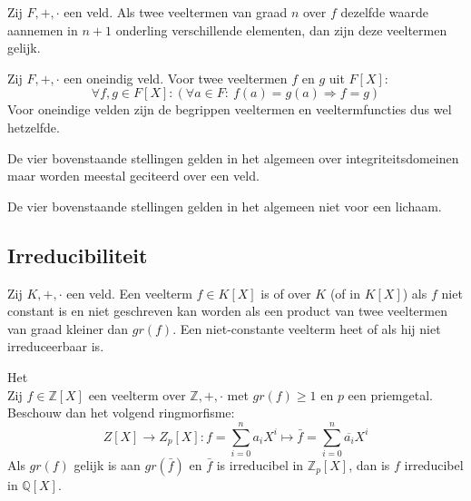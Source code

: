 \documentclass[main.tex]{subfiles}
\begin{document}
\begin{st}
  Zij $F,+,\cdot$ een veld.
  Als twee veeltermen van graad $n$ over $f$ dezelfde waarde aannemen in $n+1$ onderling verschillende elementen, dan zijn deze veeltermen gelijk.
\end{st}

\begin{st}
  Zij $F,+,\cdot$ een oneindig veld.
  Voor twee veeltermen $f$ en $g$ uit $F[X]$:
  \[ \forall f,g \in F[X]: (\forall a \in F:\ f(a) = g(a) \Rightarrow f = g) \]
  Voor oneindige velden zijn de begrippen veeltermen en veeltermfuncties dus wel hetzelfde.
\end{st}

\begin{opm}
  De vier bovenstaande stellingen gelden in het algemeen over integriteitsdomeinen maar worden meestal geciteerd over een veld.
\end{opm}

\begin{opm}
  De vier bovenstaande stellingen gelden in het algemeen niet voor een lichaam.
\end{opm}

\subsection{Irreducibiliteit}
\label{sec:irreducibiliteit}


\begin{de}
  Zij $K,+,\cdot$ een veld.
  Een veelterm $f\in K[X]$ is  of  over $K$ (of in $K[X]$) als $f$ niet constant is en niet geschreven kan worden als een product van twee veeltermen van graad kleiner dan $gr(f)$.
  Een niet-constante veelterm heet  of  als hij niet irreduceerbaar is.
\end{de}

\begin{ei}
  Het \\
  Zij $f\in \mathbb{Z}[X]$ een veelterm over $\mathbb{Z},+,\cdot$ met $gr(f) \ge 1$ en $p$ een priemgetal.
  Beschouw dan het volgend ringmorfisme:
  \[ Z[X] \rightarrow Z_{p}[X]: f = \sum_{i=0}^{n}a_{i}X^{i} \mapsto \bar{f} = \sum_{i=0}^{n}\overline{a_{i}}X^{i} \]
  Als $gr(f)$ gelijk is aan $gr(\bar{f})$ en $\bar{f}$ is irreducibel in $\mathbb{Z}_{p}[X]$, dan is $f$ irreducibel in $\mathbb{Q}[X]$.
\end{ei}
\end{document}
